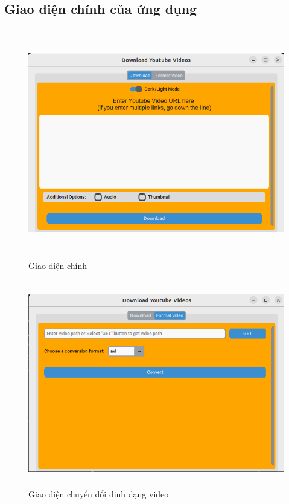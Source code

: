 \documentclass{article} %
\begin{document}
\subsection{Giao diện chính của ứng dụng}
\begin{figure}[H]
    \centering
    \includegraphics[width=15cm, height=10cm]{images/main1.PNG}
    \caption{Giao diện chính}
    \label{fig:enter-label}
\end{figure}
\begin{figure}[H]
    \centering
    \includegraphics[width=15cm, height=9cm]{images/main2.PNG}
    \caption{Giao diện chuyển đổi định dạng video}
    \label{fig:enter-label}
\end{figure}
\end{document}
